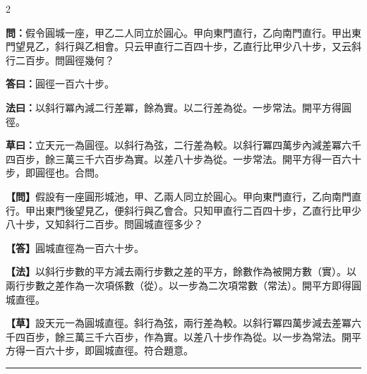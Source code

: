 \documentclass[11pt,a4paper]{article}
\newcommand{\longline}{\noindent\rule{\textwidth}{0.4pt}}
\newcommand{\wenC}[1]{\par\noindent\textbf{\textcolor{probcolor}{問：}}{#1}\par}
\newcommand{\daC}[1]{\par\noindent\textbf{\textcolor{anscolor}{答曰：}}{#1}\par}
\newcommand{\fayueC}[1]{\par\noindent\textbf{\textcolor{methodcolor}{法曰：}}{#1}\par}
\newcommand{\caoyueC}[1]{\par\noindent\textbf{草曰：}{#1}\par}
\newcommand{\wenM}[1]{\par\noindent\textbf{\textcolor{probcolor}{【問】}}{#1}\par}
\newcommand{\daM}[1]{\par\noindent\textbf{\textcolor{anscolor}{【答】}}{#1}\par}
\newcommand{\fayueM}[1]{\par\noindent\textbf{\textcolor{methodcolor}{【法】}}{#1}\par}
\newcommand{\caoyueM}[1]{\par\noindent\textbf{【草】}{#1}\par}
\begin{document}
\begin{paracol}{2}

\wenC{假令圓城一座，甲乙二人同立於圓心。甲向東門直行，乙向南門直行。甲出東門望見乙，斜行與乙相會。只云甲直行二百四十步，乙直行比甲少八十步，又云斜行二百步。問圓徑幾何？}

\daC{圓徑一百六十步。}

\fayueC{以斜行冪內減二行差冪，餘為實。以二行差為從。一步常法。開平方得圓徑。}

\caoyueC{立天元一為圓徑。以斜行為弦，二行差為較。以斜行冪四萬步內減差冪六千四百步，餘三萬三千六百步為實。以差八十步為從。一步常法。開平方得一百六十步，即圓徑也。合問。}

\switchcolumn

\wenM{假設有一座圓形城池，甲、乙兩人同立於圓心。甲向東門直行，乙向南門直行。甲出東門後望見乙，便斜行與乙會合。只知甲直行二百四十步，乙直行比甲少八十步，又知斜行二百步。問圓城直徑多少？}

\daM{圓城直徑為一百六十步。}

\fayueM{以斜行步數的平方減去兩行步數之差的平方，餘數作為被開方數（實）。以兩行步數之差作為一次項係數（從）。以一步為二次項常數（常法）。開平方即得圓城直徑。}

\caoyueM{設天元一為圓城直徑。斜行為弦，兩行差為較。以斜行冪四萬步減去差冪六千四百步，餘三萬三千六百步，作為實。以差八十步作為從。以一步為常法。開平方得一百六十步，即圓城直徑。符合題意。}

\end{paracol}

\vspace{0.3cm}
\longline
\end{document}
